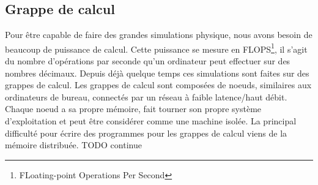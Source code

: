 \subsection{Grappe de calcul}
Pour être capable de faire des grandes simulations physique, nous avons besoin de beaucoup de puissance de calcul.
%
Cette puissance se mesure en FLOPS\footnote{FLoating-point Operations Per Second}, il s'agit du nombre d'opérations par seconde qu'un ordinateur peut effectuer sur des nombres décimaux.
%
Depuis déjà quelque temps ces simulations sont faites sur des grappes de calcul.
%
Les grappes de calcul sont composées de noeuds, similaires aux ordinateurs de bureau, connectés par un réseau à faible latence/haut débit.
%
Chaque noeud a sa propre mémoire, fait tourner son propre système d'exploitation et peut être considérer comme une machine isolée.
%
La principal difficulté pour écrire des programmes pour les grappes de calcul viens de la mémoire distribuée. TODO continue

